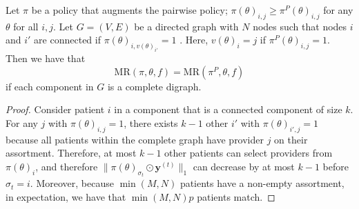 \documentclass[10pt,a4paper]{amsart}
\begin{document}
\begin{lemma}
    \label{lem:augment}
    Let $\pi$ be a policy that augments the pairwise policy; $\pi(\theta)_{i,j} \geq \pi^{P}(\theta)_{i,j}$ for any $\theta$ for all $i,j$. 
    Let $G = (V,E)$ be a directed graph with $N$ nodes such that nodes $i$ and $i'$ are connected if $\pi(\theta)_{i,v(\theta)_{i'}} = 1$ . 
    Here, $v(\theta)_{i} = j$ if $\pi^{P}(\theta)_{i,j} = 1$.
    Then we have that
    \begin{equation}
        \mathrm{MR}(\pi,\theta,f) = \mathrm{MR}(\pi^{P},\theta,f) 
    \end{equation}
    if each component in $G$ is a complete digraph.  
\end{lemma}

\begin{proof}
Consider patient $i$ in a component that is a connected component of size $k$. 
For any $j$ with $\pi(\theta)_{i,j}=1$, there exists $k-1$ other $i'$ with $\pi(\theta)_{i',j}=1$ because all patients within the complete graph have provider $j$ on their assortment. 
Therefore, at most $k-1$ other patients can select providers from $\pi(\theta)_{i}$, and therefore $\lVert \pi(\theta)_{\sigma_{t}} \odot \mathbf{y}^{(t)} \rVert_{1}$ can decrease by at most $k-1$ before $\sigma_{t}=i$. 
Moreover, because $\min(M,N)$ patients have a non-empty assortment, in expectation, we have that $\min(M,N)p$ patients match.%


\end{proof}
\end{document}
